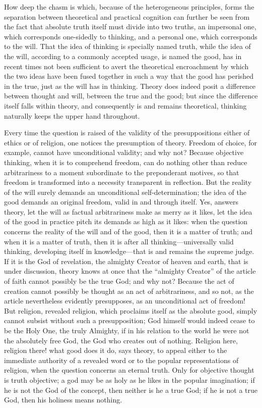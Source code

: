 \documentclass[12pt,a4paper]{article}
\newcommand{\opage}[1]{\marginnote{\footnotesize\textit{[#1]}}}
\begin{document}
How deep the chasm is which, because of the heterogeneous principles,
forms the separation between theoretical and practical cognition can
further be seen from the fact that absolute truth itself must divide
into two truths, an impersonal one, which corresponds one-sidedly to
thinking, and a personal one, which corresponds to the will. That the
idea of thinking is specially named truth, while the idea of the
will, according to a commonly accepted
\opage{70}usage, is named the good, has in recent times not been
sufficient to avert the theoretical encroachment by which the two
ideas have been fused together in such a way that the good has
perished in the true, just as the will has in thinking. Theory does
indeed posit a difference between thought and will, between the true
and the good; but since the difference itself falls within theory, and
consequently is and remains theoretical, thinking naturally keeps the
upper hand throughout.

Every time the question is raised of the validity of the
presuppositions either of ethics or of religion, one notices the
presumption of theory. Freedom of choice, for example, cannot have
unconditional validity; and why not? Because objective thinking, when
it is to comprehend freedom, can do nothing other than reduce
arbitrariness to a moment subordinate to the preponderant motives, so
that freedom is transformed into a necessity transparent in
reflection. But the reality of the will surely demands an
unconditional self-determination; the idea of the good demands an
original freedom, valid in and through itself. Yes, answers theory,
let the will as factual arbitrariness make as merry as it likes, let
the idea of the good in practice pitch its demands as high as it
likes: when the question concerns the reality of the will and of the
good, then it is a matter of truth; and when it is a matter of truth,
then it is after all thinking---universally valid thinking, developing
itself in knowledge---that is and remains the supreme judge. If it is
the God of revelation, the almighty Creator of heaven and earth, that
is under discussion, theory knows at once that the ``almighty
Creator'' of the article of faith cannot possibly be the true God; and
why not? Because the act of creation cannot possibly be thought as an
act of arbitrariness, and so not, as the article nevertheless evidently
presupposes, as an unconditional act of freedom! But religion,
revealed religion, which proclaims itself as the absolute good, simply
cannot subsist without such a presupposition;
\opage{71}God himself would indeed cease to be the Holy One, the truly
Almighty, if in his relation to the world he were not the absolutely
free God, the God who creates out of nothing. Religion here, religion
there! what good does it do, says theory, to appeal either to the
immediate authority of a revealed word or to the popular
representations of religion, when the question concerns an eternal
truth. Only for objective thought is truth objective; a god may be as
holy as he likes in the popular imagination; if he is not the God of
the concept, then neither is he a true God; if he is not a true God,
then his holiness means nothing.
\end{document}
